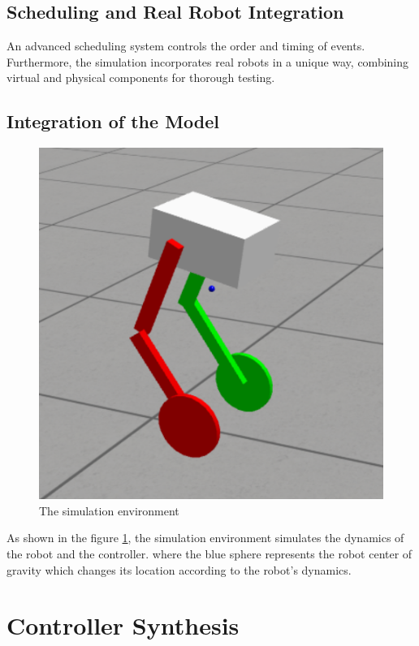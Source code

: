 \subsection{Scheduling and Real Robot Integration}
An advanced scheduling system controls the order and timing of events. Furthermore, the simulation incorporates real robots in a unique way, combining virtual and physical components for thorough testing\cite{Bachlorsthesis}.
\subsection{Integration of the Model}
\begin{figure}[h]
	\centering
	\includegraphics[width=.5\textwidth]{Simulation Environment}
	\caption{The simulation environment}
	\label{fig:The simulation environment}
\end{figure}
As shown in the figure \ref{fig:The simulation environment}, the simulation environment simulates the dynamics of the robot and the controller. where the blue sphere represents the robot center of gravity which changes its location according to the robot's dynamics.



%
%

\section{Controller Synthesis}

